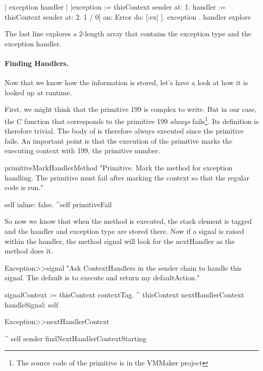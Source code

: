 \documentclass[a4paper,10pt,twoside]{book}
\begin{document}
\begin{code}{}
| exception handler | 
[exception := thisContext sender at: 1. 
 handler := thisContext sender at: 2. 
 1 / 0] 
on: Error 
do: [:ex| ]. 
{ exception . handler } explore
\end{code}

The last line explores a 2-length array that contains the exception type and the exception handler. 

\paragraph{Finding Handlers.}
Now that we know how the information is stored, let's have a look at how it is looked up at runtime. 

First, we might think that the primitive 199 is complex to write. But in our case, the C function that corresponds to the primitive 199 \emph{always} fails\footnote{The source code of the primitive is  in the VMMaker \sqsrc project}. Its definition is therefore trivial. The body of  is therefore always executed since the primitive fails. An important point is that the execution of the primitive marks the executing context with 199, the primitive number. 

\begin{code}{}
primitiveMarkHandlerMethod
     "Primitive. Mark the method for exception handling. The primitive must fail after
     marking the context so that the regular code is run."
     
     self inline: false.
    ^self primitiveFail
\end{code}

So now we know that when the method  is executed, the stack element is tagged and the handler and exception type 
are stored there. Now if a signal is raised within the handler, the method signal will look for the nextHandler as the method 
does it.

\begin{code}{}
Exception>>signal
	"Ask ContextHandlers in the sender chain to handle this signal.
	The default is to execute and return my defaultAction."

	signalContext := thisContext contextTag.
	^ thisContext nextHandlerContext handleSignal: self
\end{code}

\begin{code}{}
Exception>>nextHandlerContext

	^ self sender findNextHandlerContextStarting
\end{code}
\end{document}
